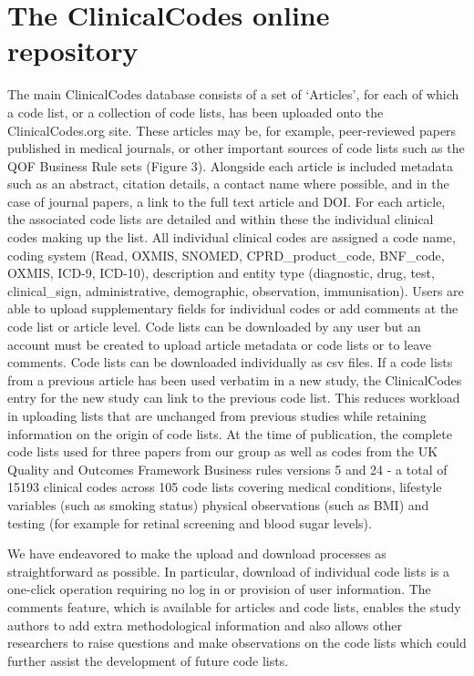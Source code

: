 \documentclass[10pt]{article}
\begin{document}
\section*{The ClinicalCodes online repository}

The main ClinicalCodes database consists of a set of `Articles', for each of which a code list, or a collection of code lists, has been uploaded onto the ClinicalCodes.org site. These articles may be, for example, peer-reviewed papers published in medical journals, or other important sources of code lists such as the QOF Business Rule sets (Figure 3). Alongside each article is included  metadata such as an abstract, citation details, a contact name where possible, and in the case of journal papers, a link to the full text article and DOI. For each article, the associated code lists are detailed and within these the individual clinical codes making up the list.  All individual clinical codes are assigned a code name, coding system (Read, OXMIS, SNOMED, CPRD\_product\_code, BNF\_code, OXMIS, ICD-9, ICD-10), description and entity type (diagnostic, drug, test, clinical\_sign, administrative, demographic, observation, immunisation).  Users are able to upload supplementary fields for individual codes or add comments at the code list or article level.  Code lists can be downloaded by any user but an account must be created to upload article metadata or code lists or to leave comments. Code lists can be downloaded individually as csv files. If a code lists from a previous article has been used verbatim in a new study, the ClinicalCodes entry for the new study can link to the previous code list.  This reduces workload in uploading lists that are unchanged from previous studies while retaining information on the origin of code lists.  At the time of publication, the complete code lists used for three papers from our group \cite{Doran2011, Kontopantelis2014, Reeves2014} as well as codes from the UK Quality and Outcomes Framework Business rules versions 5 and 24 - a total of 15193 clinical codes across 105 code lists covering medical conditions, lifestyle variables (such as smoking status) physical observations (such as BMI) and testing (for example for retinal screening and blood sugar levels).

We have endeavored to make the upload and download processes as straightforward as possible. In particular, download of individual code lists is a one-click operation requiring no log in or provision of user information.  The comments feature, which is available for articles and code lists, enables the study authors to add extra methodological information and also allows other researchers to raise questions and make observations on the code lists which could further assist the development of future code lists.
\end{document}
